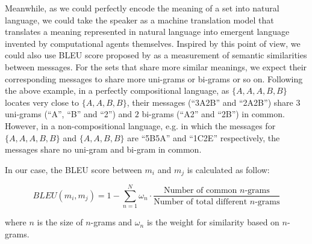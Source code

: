 Meanwhile, as we could perfectly encode the meaning of a set into natural language, we could take the speaker as a machine translation model that translates a meaning represented in natural language into emergent language invented by computational agents themselves. Inspired by this point of view, we could also use BLEU score proposed by \cite{papineni2002bleu} as a measurement of semantic similarities between messages. For the sets that share more similar meanings, we expect their corresponding messages to share more uni-grams or bi-grams or so on. Following the above example, in a perfectly compositional language, as $\{A,A,A,B,B\}$ locates very close to $\{A,A,B,B\}$, their messages (``3A2B'' and ``2A2B'') share $3$ uni-grams (``A'', ``B'' and ``2'') and $2$ bi-grams (``A2'' and ``2B'') in common. However, in a non-compositional language, e.g. in which the messages for $\{A,A,A,B,B\}$ and $\{A,A,B,B\}$ are ``5B5A'' and ``1C2E'' respectively, the messages share no uni-gram and bi-gram in common.

In our case, the BLEU score between $m_i$ and $m_j$ is calculated as follow:

\begin{equation}
  BLEU(m_i, m_j) = 1 - \sum_{n=1}^{N} \omega_n \cdot \frac{\mbox{Number of common } n\mbox{-grams}}{\mbox{Number of total different } n\mbox{-grams}}
  \label{eq3.3.1:bleu_score}
\end{equation}

where $n$ is the size of $n$-grams and $\omega_n$ is the weight for similarity based on $n$-grams.
